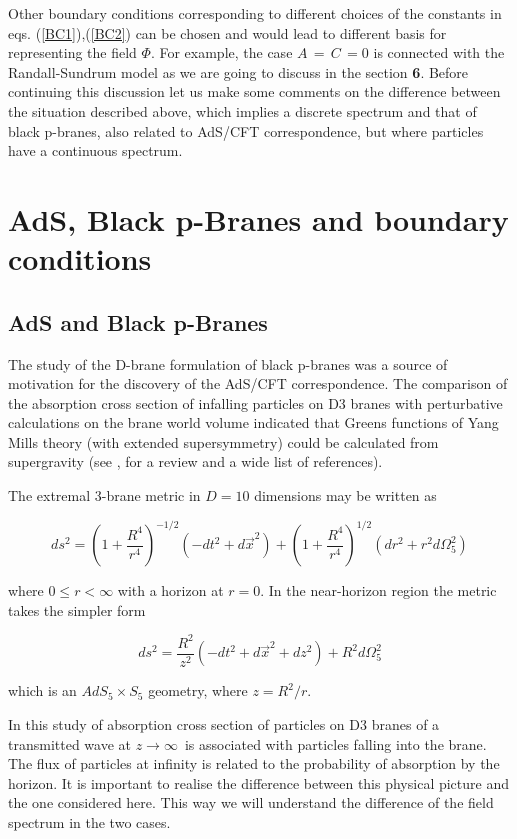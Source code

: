 \documentclass[a4paper,12pt]{article}
\begin{document}
Other boundary conditions corresponding to different choices of 
the constants in eqs. (\ref{BC1}),(\ref{BC2}) can be chosen and 
would  lead to different  basis for representing the field $\Phi$. 
For  example, the case $A\,=\,C\,= 0$  is connected with the 
Randall-Sundrum model as we are going to discuss in the section 
{\bf 6}. Before continuing this discussion let us make some comments
on the difference between the situation described above, which implies
a discrete spectrum and that of black p-branes, also related to
AdS/CFT correspondence, but where particles have a continuous spectrum.

 
\section{AdS, Black p-Branes and boundary conditions}

\subsection{AdS and Black p-Branes }

The study of the D-brane formulation of black p-branes was a source
of motivation for the discovery of the AdS/CFT correspondence.
The comparison of the absorption cross section of infalling particles
on D3 branes with perturbative calculations on the brane world 
volume\cite{Kle1}  indicated that  Greens functions of 
Yang Mills theory (with extended supersymmetry) could be calculated 
from  supergravity (see  \cite{Malda2},\cite{Kle2} for a review 
and a wide list of references).

The extremal 3-brane metric in $D=10$ dimensions\cite{HoSt91} may be 
written as

\begin{equation}
ds^2=\left(1+\frac{R^4}{r^4}\right)^{-1/2}(-dt^2+d\vec{x}^2)
+\left(1+\frac{R^4}{r^4}\right)^{1/2}(dr^2 +r^2d\Omega_5^2)
\end{equation}

\noindent where $0\le r <\infty$  with a horizon at $r=0$. 
In the near-horizon region the metric takes the simpler form

\begin{equation}
ds^2=\frac{R^2}{z^2}(-dt^2+d\vec{x}^2+dz^2) + R^2d\Omega_5^2
\end{equation}

\noindent which is an $AdS_5 \times S_5$ geometry, where $z=R^2/r$.

In this study of absorption cross section of particles
on D3 branes of \cite{Kle1} a transmitted wave at 
$z\rightarrow \infty\,$ is associated with particles falling into 
the brane. The flux of particles at infinity is related to the  probability of 
absorption by the horizon. 
It is important to realise the difference between this physical picture 
and the one considered here.
This way we will understand the difference of the field spectrum in the 
two cases.
\end{document}
